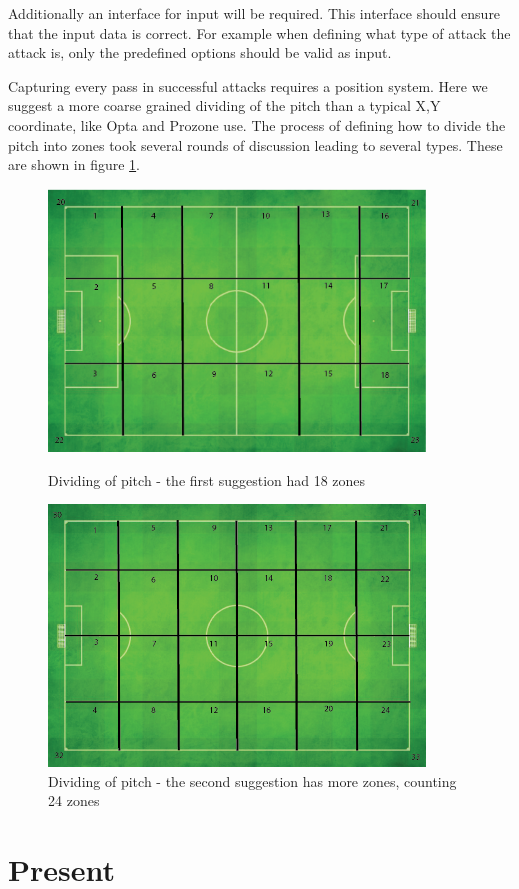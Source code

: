 Additionally an interface for input will be required. This interface should ensure that the input data is correct. For example when defining what type of attack the attack is, only the predefined options should be valid as input. 

Capturing every pass in successful attacks requires a position system. Here we suggest a more coarse grained dividing of the pitch than a typical X,Y coordinate, like Opta and Prozone use. The process of defining how to divide the pitch into zones took several rounds of discussion leading to several types. These are shown in figure \ref{fig:zones}.

\begin{figure}[ht!]
\centering
\includegraphics[width=100mm]{images/general/first_zones.png}
\caption{Dividing of pitch - the first suggestion had 18 zones}
\includegraphics[width=100mm]{images/general/second_zones.png}
\caption{Dividing of pitch - the second suggestion has more zones, counting 24 zones}
\label{fig:zones}
\end{figure}


\section{Present}

